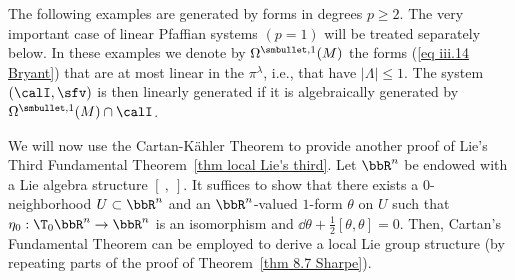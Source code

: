 The following examples are generated by forms in degrees $p\geq 2$. The very important case of linear Pfaffian systems $(p=1)$ will be treated separately below. In these examples we denote by $\Omega^{\smbullet,1}(M)$ the forms (\ref{eq iii.14 Bryant}) that are  at most linear in the $\pi^\lambda$, i.e., that have $|\Lambda|\leq 1$. The system $(\calI,\sfv)$ is then linearly generated if it is algebraically generated by $\Omega^{\smbullet,1}(M)\cap \calI$.


\begin{example}\label{example Lie III EDS}
    We will now use the Cartan-K\"ahler Theorem to provide another proof of Lie's Third Fundamental Theorem~\ref{thm local Lie's third}. Let $\bbR^n$ be endowed with a Lie algebra structure $[~,~]$. It suffices to show that there exists a $0$-neighborhood  $U\subset\bbR^n$ and an $\bbR^n$-valued $1$-form $\theta$ on $U$ such that $\eta_0:\T_0\bbR^n\to\bbR^n$ is an isomorphism and $\dd \theta+\frac12[\theta,\theta]=0$. Then, Cartan's Fundamental Theorem can be employed to derive a local Lie group structure (by repeating parts of the proof of Theorem~\ref{thm 8.7 Sharpe}).


\end{example}
